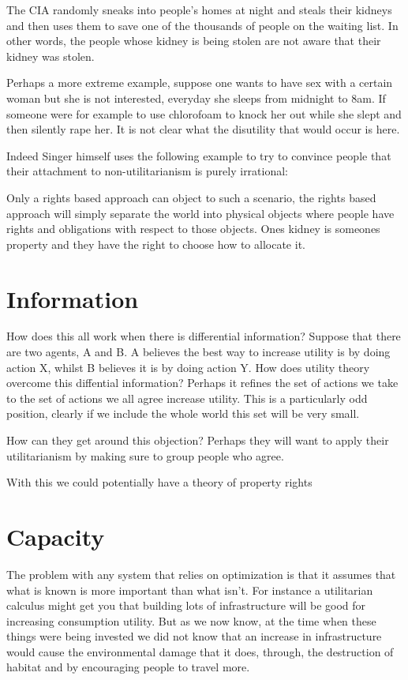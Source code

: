 \documentclass[12pt]{report}
\numberwithin{equation}{section}
\begin{document}
The CIA randomly sneaks into people's homes at night and steals their kidneys and then uses them to save one of the thousands of people on the waiting list. In other words, the people whose kidney is being stolen are not aware that their kidney was stolen. 

Perhaps a more extreme example, suppose one wants to have sex with a certain woman but she is not interested, everyday she sleeps from midnight to 8am. If someone were for example to use chlorofoam to knock her out while she slept and then silently rape her. It is not clear what the disutility that would occur is here. 

Indeed Singer himself uses the following example to try to convince people that their attachment to non-utilitarianism is purely irrational: 

Only a rights based approach can object to such a scenario, the rights based approach will simply separate the world into physical objects where people have rights and obligations with respect to those objects. Ones kidney is someones property and they have the right to choose how to allocate it. 


\section{Information}

How does this all work when there is differential information? Suppose that there are two agents, A and B. A believes the best way to increase utility is by doing action X, whilst B believes it is by doing action Y. How does utility theory overcome this diffential information? Perhaps it refines the set of actions we take to the set of actions we all agree increase utility. This is a particularly odd position, clearly if we include the whole world this set will be very small. 

How can they get around this objection? Perhaps they will want to apply their utilitarianism by making sure to group people who agree. 

With this we could potentially have a theory of property rights

\section{Capacity}


The problem with any system that relies on optimization is that it assumes that what is known is more important than what isn't. For instance a utilitarian calculus might get you that building lots of infrastructure will be good for increasing consumption utility. But as we now know, at the time when these things were being invested we did not know that an increase in infrastructure would cause the environmental damage that it does, through, the destruction of habitat and by encouraging people to travel more. 
\end{document}
